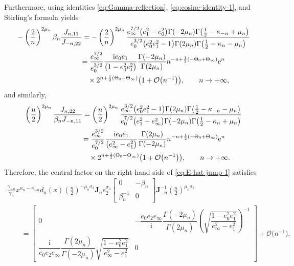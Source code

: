 \documentclass[11pt]{article}
\numberwithin{equation}{section}
\numberwithin{equation}{section}
\newcommand{\ee}{\mathrm{e}}
\newcommand{\ii}{\mathrm{i}}
\begin{document}
Furthermore, using identities \eqref{eq:Gamma-reflection}, \eqref{eq:cosine-identity-1}, and Stirling's formula yields
\begin{align*}
 & -\left(\frac{2}{n}\right)^{2\mu_n}\beta_n\frac{J_{n,11}}{J_{-n,22}} = -\left(\frac{2}{n}\right)^{2\mu_n} \frac{e_\infty^{7/2} \big(e_1^2-e_0^2\big) \Gamma (-2 \mu_n ) \Gamma \big(\frac{1}{2}-\kappa_{-n}+\mu_n \big)}{e_0^{3/2} \big(e_0^2 e_1^2-1\big) \Gamma (2 \mu_n ) \Gamma \big(\frac{1}{2}-\kappa_{n}-\mu_n \big)} \\
 &\hphantom{-\left(\frac{2}{n}\right)^{2\mu_n}\beta_n\frac{J_{n,11}}{J_{-n,22}}}{}
 = \frac{e_\infty^{7/2}}{e_0^{3/2}} \dfrac{\ii e_0e_1}{\big(1- e_0^2 e_1^2\big) } \dfrac{\Gamma (-2 \mu_n ) }{ \Gamma (2 \mu_n ) } n^{-n+\frac{1}{2}(-\Theta_0+\Theta_\infty)}\ee^n \\
 &\hphantom{-\left(\frac{2}{n}\right)^{2\mu_n}\beta_n\frac{J_{n,11}}{J_{-n,22}}=}{}
 \times 2^{n + \frac{1}{2}(\Theta_0-\Theta_\infty)}\big(1+\mathcal{O}\big(n^{-1}\big)\big),\qquad n\to+\infty,
\end{align*}
and similarly,
\begin{align*}
&\left(\frac{n}{2}\right)^{2\mu_n}\frac{J_{n,22}}{\beta_nJ_{-n,11}} = \left(\frac{n}{2}\right)^{2\mu_n} \frac{e_\infty^{3/2}\big(e_0^2 e_1^2-1\big) \Gamma (2 \mu_n ) \Gamma \big(\frac{1}{2}-\kappa_{-n}-\mu_n \big)}{e_0^{7/2} \big(e_1^2-e_\infty^2\big) \Gamma (-2 \mu_n ) \Gamma \big(\frac{1}{2}-\kappa_n+\mu_n \big)}\\
&\hphantom{\left(\frac{n}{2}\right)^{2\mu_n}\frac{J_{n,22}}{\beta_nJ_{-n,11}}}{}
= \frac{e_\infty^{3/2}}{e_0^{7/2}} \dfrac{\ii e_0e_1}{\big(e_\infty^2 - e_1^2\big)}\dfrac{ \Gamma (2 \mu_n ) }{ \Gamma (-2 \mu_n )}n^{-n+\frac{1}{2}(-\Theta_0+\Theta_\infty)}\ee^n \\
&\hphantom{\left(\frac{n}{2}\right)^{2\mu_n}\frac{J_{n,22}}{\beta_nJ_{-n,11}}=}{}
\times 2^{n + \frac{1}{2}(\Theta_0-\Theta_\infty)}\big(1+\mathcal{O}\big(n^{-1}\big)\big),\qquad n\to+\infty.
\end{align*}
Therefore, the central factor on the right-hand side of \eqref{eq:E-hat-jump-1} satisfies
\begin{gather*}
\frac{\gamma_{-n}}{\gamma_n}x^{\kappa_n-\kappa_{-n}}d_n(x)\left(\frac{n}{2}\right)^{-\mu_n\sigma_3}\mathbf{J}_ne_2^{\sigma_3}\begin{bmatrix}0 & -\beta_n\\\beta_n^{-1} & 0\end{bmatrix}\mathbf{J}_{-n}^{-1}\left(\frac{n}{2}\right)^{\mu_n\sigma_3}\\
\qquad = \begin{bmatrix} 0 & -\dfrac{e_0 e_2 e_\infty}{\ii}\dfrac{ \Gamma (-2 \mu_n )}{ \Gamma (2 \mu_n )} \left(\sqrt{\dfrac{1 - e_0^2 e_1^2}{e_\infty^2-e_1^2 } }\right)^{-1} \\
 \dfrac{ \ii }{e_0 e_2 e_\infty} \dfrac{\Gamma (2 \mu_n )}{ \Gamma (-2 \mu_n )} \sqrt{\dfrac{1 - e_0^2 e_1^2}{e_\infty^2-e_1^2 }} & 0
\end{bmatrix} + \mathcal{O}\big(n^{-1}\big).
\end{gather*}
\end{document}
